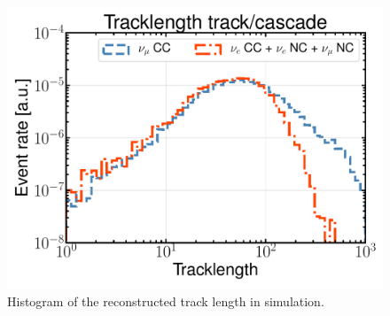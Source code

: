 \begin{figure}
    \centering
    \includegraphics[width=0.49\linewidth]{figures/icecube/classification/variables/tracklength.pdf}
    \caption{Histogram of the reconstructed track length in simulation.}
    \label{fig:apx-pidvars-length}
\end{figure}